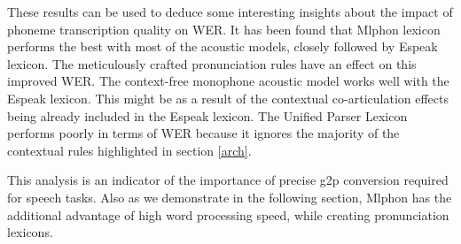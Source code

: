 \documentclass{ieeeaccess}
\begin{document}



 These results can be used to deduce some interesting insights about the impact of phoneme transcription quality on WER. It has been found that Mlphon lexicon performs the best with most of the acoustic models, closely followed by Espeak lexicon. The meticulously crafted pronunciation rules have an effect on this improved WER. The context-free monophone acoustic model works well with the Espeak lexicon. This might be as a result of the contextual co-articulation effects being already included in the Espeak lexicon. The Unified Parser Lexicon performs poorly in terms of WER because it ignores the majority of the contextual rules highlighted in section  \ref{arch}.




This analysis is an indicator of the importance of precise g2p conversion required for speech tasks. Also as we demonstrate in the following section, Mlphon has the additional advantage of high word processing speed, while creating pronunciation lexicons.
\end{document}
